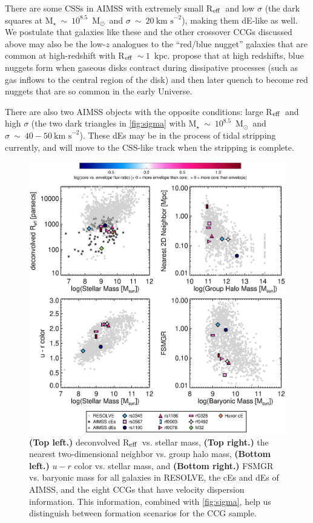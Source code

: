 \documentclass[iop,apj]{emulateapj}
\newcommand{\Reff}{R$_{\rm eff}$}
\newcommand{\Msun}{M$_{\odot}$}
\begin{document}
There are some CSSs in AIMSS with extremely small \Reff\ and low $\sigma$ (the dark squares at M$_{\star}~\sim~10^{8.5}$~\Msun\ and $\sigma~\sim~20~\text{km~s}^{-2}$), making them dE-like as well. We postulate that galaxies like these and the other crossover CCGs discussed above may also be the low-$z$ analogues to the ``red/blue nugget'' galaxies that are common at high-redshift with \Reff~$\sim~1$~kpc. \citet{Dekel2013} propose that at high redshifts, blue nuggets form when gaseous disks contract during dissipative processes (such as gas inflows to the central region of the disk) and then later quench to become red nuggets that are so common in the early Universe.

There are also two AIMSS objects with the opposite conditions: large \Reff\ and high $\sigma$ (the two dark triangles in \autoref{fig:sigma} with M$_{\star}~\sim~10^{8.5}$~\Msun\ and $\sigma~\sim~40-50~\text{km~s}^{-2}$). These dEs may be in the process of tidal stripping currently, and will move to the CSS-like track when the stripping is complete.

\begin{figure}[b]
\begin{center}
\includegraphics[scale=0.7]{miniplots.eps}
\caption{\textbf{(Top left.)} deconvolved \Reff\ vs. stellar mass, \textbf{(Top right.)} the nearest two-dimensional neighbor vs. group halo mass, \textbf{(Bottom left.)} $u-r$ color vs. stellar mass, and \textbf{(Bottom right.)} FSMGR vs. baryonic mass for all galaxies in RESOLVE, the cEs and dEs of AIMSS, and the eight CCGs that have velocity dispersion information. This information, combined with \autoref{fig:sigma}, help us distinguish between formation scenarios for the CCG sample.}
\label{fig:miniplots}
\end{center}
\end{figure}
\end{document}
